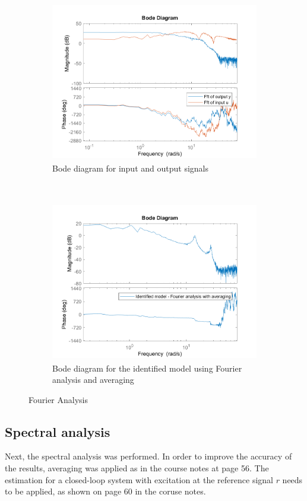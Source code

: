 \documentclass[a4paper,11pt]{article}
\begin{document}
\begin{figure}[H]
\centering
\begin{subfigure}[t]{0.45\textwidth}
  \centering
  \includegraphics[height = 7cm]{images/2_Fourier_analysis}
  \caption{Bode diagram for input and output signals}
  \label{fig:bode_io}
\end{subfigure}
~\qquad \qquad
\begin{subfigure}[t]{0.45\textwidth}
  \centering
  \includegraphics[height = 7cm]{images/1_Fourier_analysis}
  \caption{Bode diagram for the identified model using Fourier analysis and averaging}
  \label{fig:bode_model}
\end{subfigure}

\caption{Fourier Analysis}
\label{fig:FA}
\end{figure}


\subsection{Spectral analysis}

Next, the spectral analysis was performed. In order to improve the accuracy of the results, averaging was applied as in the course notes at page 56. The estimation for a closed-loop system with excitation at the reference signal $r$ needs to be applied, as shown on page 60 in the coruse notes.
\end{document}
